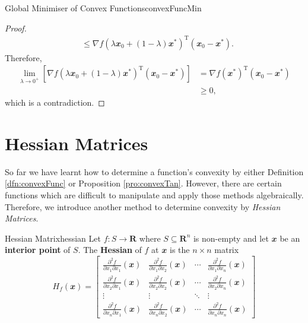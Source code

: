\documentclass[math]{amznotes}
\theoremstyle{remark}
\begin{document}
\begin{thmbox}{Global Minimiser of Convex Functions}{convexFuncMin}
\begin{proof}
\begin{align*}
            & \leq \nabla f\left(\lambda\mathbfit{x}_0 + (1 - \lambda)\mathbfit{x}^*\right)^{\mathrm{T}}(\mathbfit{x_0 - x^*}).
        \end{align*}
        Therefore,
        \begin{align*}
            \lim_{\lambda \to 0^+}\left[\nabla f\left(\lambda\mathbfit{x}_0 + (1 - \lambda)\mathbfit{x}^*\right)^{\mathrm{T}}(\mathbfit{x_0 - x^*})\right] & = \nabla f(\mathbfit{x}^*)^{\mathrm{T}}(\mathbfit{x_0 - x^*}) \\
            & \geq 0,
        \end{align*}
        which is a contradiction.
    \end{proof}
\end{thmbox}

\section{Hessian Matrices}
So far we have learnt how to determine a function's convexity by either Definition \ref{dfn:convexFunc} or Proposition \ref{pro:convexTan}. However, there are certain functions which are difficult to manipulate and apply those methods algebraically. Therefore, we introduce another method to determine convexity by \textit{Hessian Matrices}.
\begin{dfnbox}{Hessian Matrix}{hessian}
    Let $f \colon S \to \mathbf{R}$ where $S \subseteq \mathbf{R}^n$ is non-empty and let $\mathbfit{x}$ be an {\color{red} \textbf{interior point}} of $S$. The {\color{red} \textbf{Hessian}} of $f$ at $\mathbfit{x}$ is the $n \times n$ matrix
    \begin{displaymath}
        H_f(\mathbfit{x}) = \begin{bmatrix}
            \frac{\partial^2f}{\partial x_1 \partial x_1}(\mathbfit{x}) & \frac{\partial^2f}{\partial x_1 \partial x_2}(\mathbfit{x}) & \cdots & \frac{\partial^2f}{\partial x_1 \partial x_n}(\mathbfit{x}) \\
            \frac{\partial^2f}{\partial x_2 \partial x_1}(\mathbfit{x}) & \frac{\partial^2f}{\partial x_2 \partial x_2}(\mathbfit{x}) & \cdots & \frac{\partial^2f}{\partial x_2 \partial x_n}(\mathbfit{x}) \\
            \vdots & \vdots & \ddots & \vdots \\
            \frac{\partial^2f}{\partial x_n \partial x_1}(\mathbfit{x}) & \frac{\partial^2f}{\partial x_n \partial x_2}(\mathbfit{x}) & \cdots & \frac{\partial^2f}{\partial x_n \partial x_n}(\mathbfit{x})
        \end{bmatrix}
    \end{displaymath}
\end{dfnbox}
\end{document}
